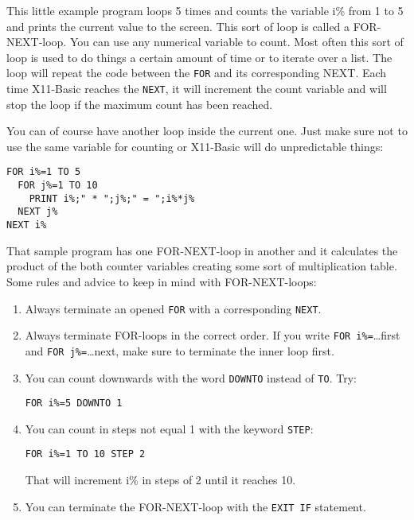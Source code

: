 This little example program loops 5 times and counts the variable i\% from 1 to
5 and prints the current value to the screen. This sort of loop is called a
FOR-NEXT-loop. You can use any numerical variable to count. Most often this
sort of loop is used to do things a certain amount of time or to iterate over a
list. The loop will repeat the code between the \verb|FOR| and its corresponding NEXT.
Each time X11-Basic reaches the \verb|NEXT|, it will increment the count variable and
will stop the loop if the maximum count has been reached.

You can of course have another loop inside the current one. Just make sure not
to use the same variable for counting or X11-Basic will do unpredictable things:
\begin{mdframed}[hidealllines=true,backgroundcolor=blue!20]
\begin{verbatim}
FOR i%=1 TO 5
  FOR j%=1 TO 10
    PRINT i%;" * ";j%;" = ";i%*j%
  NEXT j%
NEXT i%
\end{verbatim}
\end{mdframed}

That sample program has one FOR-NEXT-loop in another and it calculates the
product of the both counter variables creating some sort of multiplication
table. Some rules and advice to keep in mind with FOR-NEXT-loops:

\begin{enumerate}
\item Always terminate an opened \verb|FOR| with a corresponding \verb|NEXT|.
\item Always
terminate FOR-loops in the correct order. If you write \verb|FOR i%=|\dots first and 
\verb|FOR j%=|\dots next, make sure to terminate the inner loop first.
\item You can count
downwards with the word \verb|DOWNTO| instead of \verb|TO|.
Try:
\begin{mdframed}[hidealllines=true,backgroundcolor=blue!20]
\begin{verbatim}
FOR i%=5 DOWNTO 1
\end{verbatim}
\end{mdframed}
\item You can count in steps not equal 1 with the keyword \verb|STEP|: 
\begin{mdframed}[hidealllines=true,backgroundcolor=blue!20]
\begin{verbatim}
FOR i%=1 TO 10 STEP 2
\end{verbatim}
\end{mdframed}
That will increment i\% in steps of 2 until it reaches 10. 
\item You can terminate the FOR-NEXT-loop with the \verb|EXIT IF| statement.
\end{enumerate}


